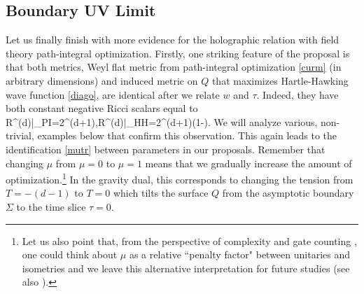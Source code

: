 \documentclass[a4paper,12pt]{article}
\begin{document}
\subsection{Boundary UV Limit}
Let us finally finish with more evidence for the holographic relation with field theory path-integral optimization.  Firstly, one striking feature of the proposal is that both metrics, Weyl flat metric from path-integral optimization \eqref{curm} (in arbitrary dimensions) and induced metric on $Q$ that maximizes Hartle-Hawking wave function \eqref{diago}, are identical after we relate $w$ and $\tau$. Indeed, they have both constant negative Ricci scalars equal to
\be
R^{(d)}|_{PI}=2\Lambda^{(d+1)}\mu,\qquad R^{(d)}|_{HH}=2\Lambda^{(d+1)}\left(1-\right).
\ee
We will analyze various, non-trivial, examples below that confirm this observation. This again leads to the identification \eqref{mutr} between parameters in our proposals. Remember that changing $\mu$ from $\mu=0$ to $\mu=1$ means that we gradually increase the amount of optimization.\footnote{Let us also point that, from the perspective of complexity and gate counting \cite{Czech:2017ryf}, one could think about $\mu$ as a relative ``penalty factor" between unitaries and isometries and we leave this alternative interpretation for future studies (see also \cite{Bhattacharyya:2019kvj}).} In the gravity dual, this corresponds to changing the tension from $T=-(d-1)$ to $T=0$ which tilts the surface $Q$ from the asymptotic boundary $\Sigma$ to the time slice $\tau=0$. 
\end{document}
